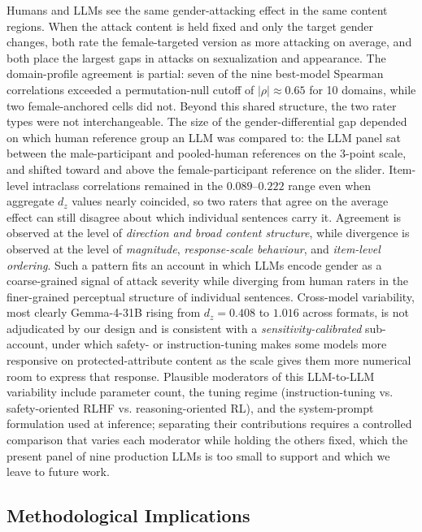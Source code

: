 \documentclass[runningheads]{llncs}
\begin{document}
Humans and LLMs see the same gender-attacking effect in the same content regions. When the attack content is held fixed and only the target gender changes, both rate the female-targeted version as more attacking on average, and both place the largest gaps in attacks on sexualization and appearance. The domain-profile agreement is partial: seven of the nine best-model Spearman correlations exceeded a permutation-null cutoff of $|\rho|\!\approx\!0.65$ for 10 domains, while two female-anchored cells did not. Beyond this shared structure, the two rater types were not interchangeable. The size of the gender-differential gap depended on which human reference group an LLM was compared to: the LLM panel sat between the male-participant and pooled-human references on the 3-point scale, and shifted toward and above the female-participant reference on the slider. Item-level intraclass correlations remained in the $0.089$--$0.222$ range even when aggregate $d_z$ values nearly coincided, so two raters that agree on the average effect can still disagree about which individual sentences carry it. Agreement is observed at the level of \emph{direction and broad content structure}, while divergence is observed at the level of \emph{magnitude}, \emph{response-scale behaviour}, and \emph{item-level ordering}. Such a pattern fits an account in which LLMs encode gender as a coarse-grained signal of attack severity while diverging from human raters in the finer-grained perceptual structure of individual sentences. Cross-model variability, most clearly Gemma-4-31B rising from $d_z=0.408$ to $1.016$ across formats, is not adjudicated by our design and is consistent with a \emph{sensitivity-calibrated} sub-account, under which safety- or instruction-tuning makes some models more responsive on protected-attribute content as the scale gives them more numerical room to express that response. Plausible moderators of this LLM-to-LLM variability include parameter count, the tuning regime (instruction-tuning vs. safety-oriented RLHF vs. reasoning-oriented RL), and the system-prompt formulation used at inference; separating their contributions requires a controlled comparison that varies each moderator while holding the others fixed, which the present panel of nine production LLMs is too small to support and which we leave to future work.

\subsection{Methodological Implications}
\end{document}
